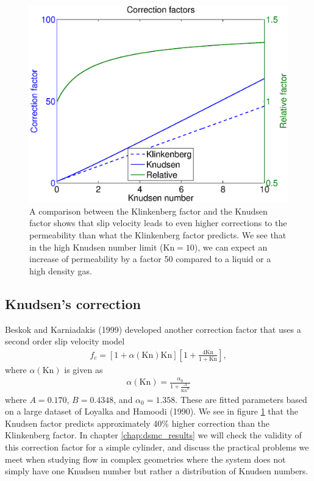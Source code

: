 \begin{figure}[h]
\begin{center}
\includegraphics[width=\textwidth, trim=0cm 0cm 0cm 0cm, clip]{figures/klinkenberg.eps}
\end{center}
\caption{A comparison between the Klinkenberg factor and the Knudsen factor shows that slip velocity leads to even higher corrections to the permeability than what the Klinkenberg factor predicts. We see that in the high Knudsen number limit ($\text{Kn}=10$), we can expect an increase of permeability by a factor 50 compared to a liquid or a high density gas.}
\label{fig:klinkenberg_correction_factor}
\end{figure}
\subsection{Knudsen's correction}
\label{sec:knudsen_correction}
Beskok and Karniadakis (1999) developed another correction factor that uses a second order slip velocity model 
\begin{align}
	\label{eq:knudsen_correction}
	f_c = [1 + \alpha(\text{Kn})\text{Kn}]\left[1 + \frac{4\text{Kn}}{ 1 + \text{Kn}}\right],
\end{align}
where $\alpha(\text{Kn})$ is given as\cite{civan2010effective}
\begin{align}
	\alpha(\text{Kn}) = \frac{\alpha_0}{1 + \frac{A}{\text{Kn}^B}}
\end{align} 
where $A=0.170$, $B=0.4348$, and $\alpha_0=1.358$. These are fitted parameters based on a large dataset of Loyalka and Hamoodi (1990). We see in figure \ref{fig:klinkenberg_correction_factor} that the Knudsen factor predicts approximately 40\% higher correction than the Klinkenberg factor. In chapter \ref{chap:dsmc_results} we will check the validity of this correction factor for a simple cylinder, and discuss the practical problems we meet when studying flow in complex geometries where the system does not simply have one Knudsen number but rather a distribution of Knudsen numbers.